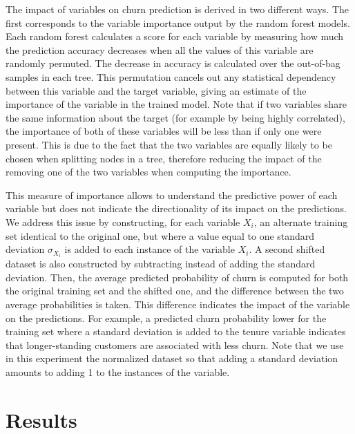 The impact of variables on churn prediction is derived in two different ways.
The first corresponds to the variable importance output by the random forest
models. Each random forest calculates a score for each variable by measuring how
much the prediction accuracy decreases when all the values of this variable are
randomly permuted. The decrease in accuracy is calculated over the out-of-bag
samples in each tree. This permutation cancels out any statistical dependency
between this variable and the target variable, giving an estimate of the
importance of the variable in the trained model. Note that if two variables
share the same information about the target (for example by being highly
correlated), the importance of both of these variables will be less than if only
one were present. This is due to the fact that the two variables are equally
likely to be chosen when splitting nodes in a tree, therefore reducing the
impact of the removing one of the two variables when computing the importance.

This measure of importance allows to understand the predictive power of each
variable but does not indicate the directionality of its impact on the
predictions. We address this issue by constructing, for each variable $X_i$, an
alternate training set identical to the original one, but where a value equal to
one standard deviation $\sigma_{X_i}$ is added to each instance of the variable
$X_i$. A second shifted dataset is also constructed by subtracting instead of
adding the standard deviation. Then, the average predicted probability of churn
is computed for both the original training set and the shifted one, and the
difference between the two average probabilities is taken. This difference
indicates the impact of the variable on the predictions. For example, a
predicted churn probability lower for the training set where a standard
deviation is added to the tenure variable indicates that longer-standing
customers are associated with less churn. Note that we use in this experiment
the normalized dataset so that adding a standard deviation amounts to adding 1
to the instances of the variable.

\section{Results}


